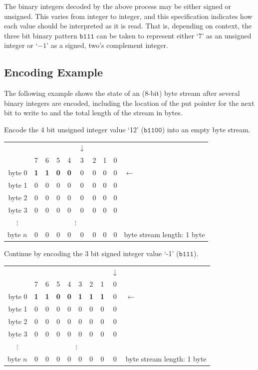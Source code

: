 \documentclass[11pt,letterpaper]{book}
\newcommand{\bin}[1]{\ensuremath{\mathtt{b#1}}}
\numberwithin{equation}{chapter}
\numberwithin{figure}{chapter}
\numberwithin{table}{chapter}
\begin{document}
The binary integers decoded by the above process may be either signed or
 unsigned.
This varies from integer to integer, and this specification
 indicates how each value should be interpreted as it is read.
That is, depending on context, the three bit binary pattern \bin{111} can be
 taken to represent either `$7$' as an unsigned integer or `$-1$' as a signed,
 two's complement integer.

\subsection{Encoding Example}

The following example shows the state of an (8-bit) byte stream after several
 binary integers are encoded, including the location of the put pointer for the
 next bit to write to and the total length of the stream in bytes.

Encode the 4 bit unsigned integer value `12' (\bin{1100}) into an empty byte
 stream.

\begin{tabular}{r|ccccccccl}
\multicolumn{1}{r}{}& &&&&$\downarrow$&&&& \\
         & 7 & 6 & 5 & 4 & 3 & 2 & 1 & 0 & \\\cline{1-9}
byte 0   & \textbf{1} & \textbf{1} & \textbf{0} & \textbf{0} &
                           0 & 0 & 0 & 0 & $\leftarrow$     \\
byte 1   & 0 & 0 & 0 & 0 & 0 & 0 & 0 & 0 &                  \\
byte 2   & 0 & 0 & 0 & 0 & 0 & 0 & 0 & 0 &                  \\
byte 3   & 0 & 0 & 0 & 0 & 0 & 0 & 0 & 0 &                  \\
\multicolumn{1}{c|}{$\vdots$}&\multicolumn{8}{c}{$\vdots$}& \\
byte $n$ & 0 & 0 & 0 & 0 & 0 & 0 & 0 & 0 &
byte stream length: 1 byte
\end{tabular}
\vspace{\baselineskip}

Continue by encoding the 3 bit signed integer value `-1' (\bin{111}).

\begin{tabular}{r|ccccccccl}
\multicolumn{1}{r}{} &&&&&&&&$\downarrow$& \\
         & 7 & 6 & 5 & 4 & 3 & 2 & 1 & 0 & \\\cline{1-9}
byte 0   & \textbf{1} & \textbf{1} & \textbf{0} & \textbf{0} &
           \textbf{1} & \textbf{1} & \textbf{1} & 0 & $\leftarrow$ \\
byte 1   & 0 & 0 & 0 & 0 & 0 & 0 & 0 & 0 &                         \\
byte 2   & 0 & 0 & 0 & 0 & 0 & 0 & 0 & 0 &                         \\
byte 3   & 0 & 0 & 0 & 0 & 0 & 0 & 0 & 0 &                         \\
\multicolumn{1}{c|}{$\vdots$}&\multicolumn{8}{c}{$\vdots$}&        \\
byte $n$ & 0 & 0 & 0 & 0 & 0 & 0 & 0 & 0 &
byte stream length: 1 byte
\end{tabular}
\vspace{\baselineskip}
\end{document}
